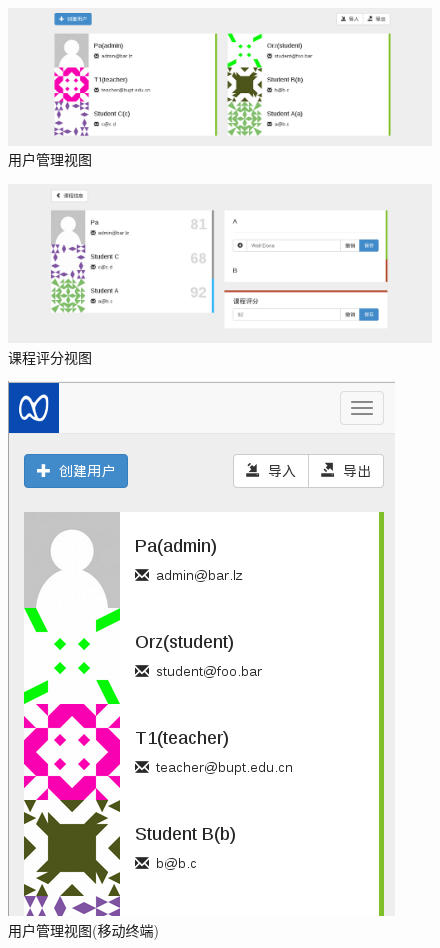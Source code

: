 \begin{figure}[!h]
  \begin{center}
    \includegraphics[scale=0.3]{figures/screenshot/userman.png}
    \caption{用户管理视图\label{SSUserMgr}}
  \end{center}
\end{figure}

\begin{figure}[!h]
  \begin{center}
    \includegraphics[scale=0.3]{figures/screenshot/review.png}
    \caption{课程评分视图\label{SSCourseReview}}
  \end{center}
\end{figure}

\begin{figure}[!h]
  \begin{center}
    \includegraphics[scale=0.5]{figures/screenshot/responsive.png}
    \caption{用户管理视图(移动终端)\label{SSResponsive}}
  \end{center}
\end{figure}

